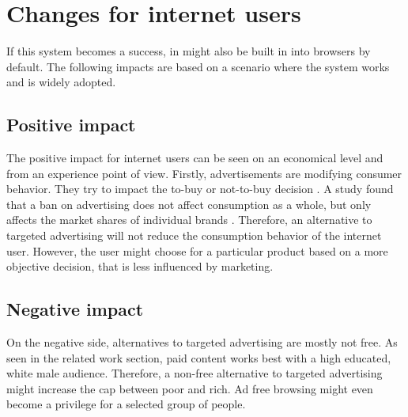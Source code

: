 \section{Changes for internet users}
If this system becomes a success, in might also be built in into browsers by default. The following impacts are based on a scenario where the system works and is widely adopted. 

\subsection{Positive impact}
The positive impact for internet users can be seen on an economical level and from an experience point of view. Firstly, advertisements are modifying consumer behavior. They try to impact the to-buy or not-to-buy decision \cite{johnson2007consumer}. A study found that a ban on advertising does not affect consumption as a whole, but only affects the market shares of individual brands \cite{advertisementsconsumption}. Therefore, an alternative to targeted advertising will not reduce the consumption behavior of the internet user. However, the user might choose for a particular product based on a more objective decision, that is less influenced by marketing.

\subsection{Negative impact}
On the negative side, alternatives to targeted advertising are mostly not free. As seen in the related work section, paid content works best with a high educated, white male audience. Therefore, a non-free alternative to targeted advertising might increase the cap between poor and rich. Ad free browsing might even become a privilege for a selected group of people.
